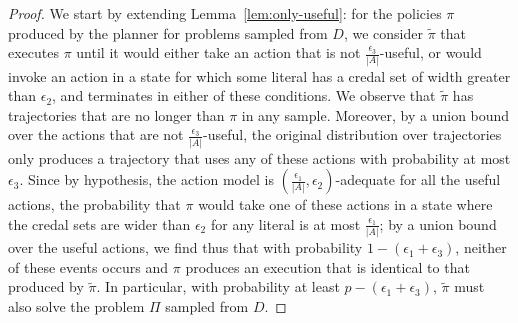 \documentclass[letterpaper]{article} %
\begin{document}
\begin{proof}
We start by extending Lemma~\ref{lem:only-useful}: for the policies $\pi$ produced by the planner for problems sampled from $D$, we consider $\tilde{\pi}$ that executes $\pi$ until it would either take an action that is not $\frac{\epsilon_3}{|A|}$-useful, or would invoke an action in a state for which some literal has a credal set of width greater than $\epsilon_2$, and terminates in either of these conditions. We observe that $\tilde{\pi}$ has trajectories that
are no longer than $\pi$ in any sample. Moreover, by a union bound over the actions that are not $\frac{\epsilon_3}{|A|}$-useful, the original distribution over trajectories only produces a trajectory that uses any of these actions with probability at most $\epsilon_3$. Since by hypothesis, the action model is $(\frac{\epsilon_1}{|A|},\epsilon_2)$-adequate for all the useful actions, the probability that $\pi$ would take one of these actions in a state where the credal sets are wider than $\epsilon_2$ for any literal is at most $\frac{\epsilon_1}{|A|}$; by a union bound over the useful actions, we find thus that with probability $1-(\epsilon_1+\epsilon_3)$, neither of these events occurs and $\pi$ produces an execution that is identical to that produced by $\tilde{\pi}$. In particular, with probability at least $p-(\epsilon_1+\epsilon_3)$, $\tilde{\pi}$ must also solve the problem $\Pi$ sampled from $D$.


\end{proof}
\end{document}
